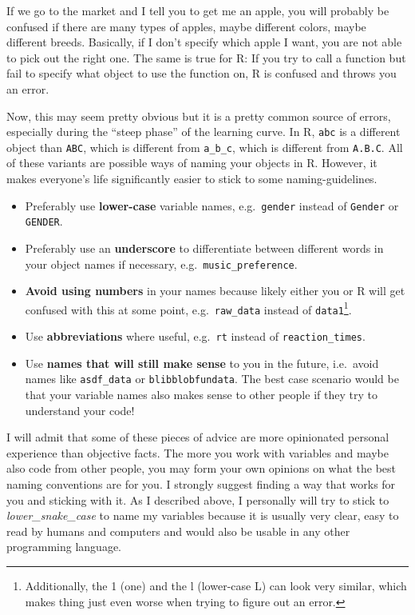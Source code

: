 \documentclass[
]{book}
\providecommand{\tightlist}{%
  \setlength{\itemsep}{0pt}\setlength{\parskip}{0pt}}
\begin{document}
If we go to the market and I tell you to get me an apple, you will probably be confused if there are many types of apples, maybe different colors, maybe different breeds.
Basically, if I don't specify which apple I want, you are not able to pick out the right one.
The same is true for R: If you try to call a function but fail to specify what object to use the function on, R is confused and throws you an error.

Now, this may seem pretty obvious but it is a pretty common source of errors, especially during the ``steep phase'' of the learning curve.
In R, \texttt{abc} is a different object than \texttt{ABC}, which is different from \texttt{a\_b\_c}, which is different from \texttt{A.B.C}. All of these variants are possible ways of naming your objects in R.
However, it makes everyone's life significantly easier to stick to some naming-guidelines.

\begin{itemize}
\tightlist
\item
  Preferably use \textbf{lower-case} variable names, e.g.~\texttt{gender} instead of \texttt{Gender} or \texttt{GENDER}.
\item
  Preferably use an \textbf{underscore} to differentiate between different words in your object names if necessary, e.g.~\texttt{music\_preference}.
\item
  \textbf{Avoid using numbers} in your names because likely either you or R will get confused with this at some point, e.g.~\texttt{raw\_data} instead of \texttt{data1}\footnote{Additionally, the 1 (one) and the l (lower-case L) can look very similar, which makes thing just even worse when trying to figure out an error.}.
\item
  Use \textbf{abbreviations} where useful, e.g.~\texttt{rt} instead of \texttt{reaction\_times}.
\item
  Use \textbf{names that will still make sense} to you in the future, i.e.~avoid names like \texttt{asdf\_data} or \texttt{blibblobfundata}. The best case scenario would be that your variable names also makes sense to other people if they try to understand your code!
\end{itemize}

I will admit that some of these pieces of advice are more opinionated personal experience than objective facts.
The more you work with variables and maybe also code from other people, you may form your own opinions on what the best naming conventions are for you.
I strongly suggest finding a way that works for you and sticking with it.
As I described above, I personally will try to stick to \emph{lower\_snake\_case} to name my variables because it is usually very clear, easy to read by humans and computers and would also be usable in any other programming language.
\end{document}
